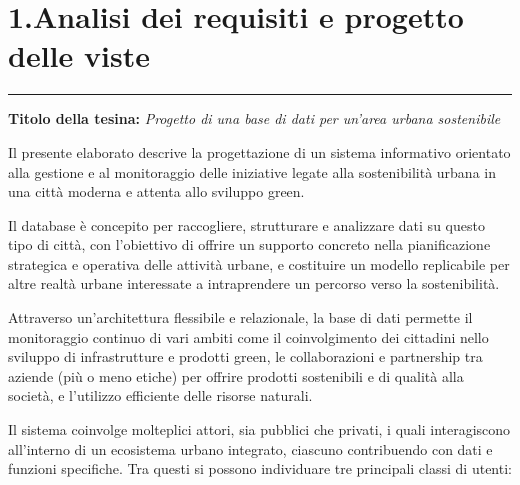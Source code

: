 \documentclass{article}
\begin{document}


\tableofcontents
\newpage


\section*{1.Analisi dei requisiti e progetto delle viste}
\raggedright

\vspace{-0.5cm}
\noindent\rule{\textwidth}{1pt}
\vspace{0.5cm}

\textbf{Titolo della tesina:} \textit{Progetto di una base di dati per un'area urbana sostenibile}

\par\vspace{0.5cm}

Il presente elaborato descrive la progettazione di un sistema informativo orientato alla gestione e al monitoraggio delle iniziative legate alla sostenibilità urbana in una città moderna e attenta allo sviluppo green.

\par\vspace{0.3cm}

Il database è concepito per raccogliere, strutturare e analizzare dati su questo tipo di città, con l'obiettivo di offrire un supporto concreto nella pianificazione strategica e operativa delle attività urbane, e costituire un modello replicabile per altre realtà urbane interessate a intraprendere un percorso verso la sostenibilità.

\par\vspace{0.3cm}

Attraverso un'architettura flessibile e relazionale, la base di dati permette il monitoraggio continuo di vari ambiti come il coinvolgimento dei cittadini nello sviluppo di infrastrutture e prodotti green, le collaborazioni e partnership tra aziende (più o meno etiche) per offrire prodotti sostenibili e di qualità alla società, e l'utilizzo efficiente delle risorse naturali.

\par\vspace{0.3cm}

Il sistema coinvolge molteplici attori, sia pubblici che privati, i quali interagiscono all’interno di un ecosistema urbano integrato, ciascuno contribuendo con dati e funzioni specifiche. Tra questi si possono individuare tre principali classi di utenti:
\end{document}
